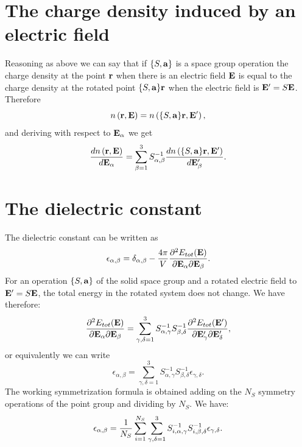 \documentclass[12pt,a4paper,twoside]{report}
\begin{document}
\section{The charge density induced by an electric field}
Reasoning as above we can say that if $\{S,{\bf a}\}$ is a space group operation the charge density
at the point ${\bf r}$ when there is an electric field ${\bf E}$ is equal to the charge density at the rotated point  $\{S,{\bf a}\}{\bf r}$ when the electric field
is ${\bf E}'=S {\bf E}$. Therefore
\begin{equation}
n\left({\bf r}, {\bf E}\right)
=n\left(\{S,{\bf a}\} {\bf r}, {\bf E}'\right), 
\end{equation}
and deriving with respect to ${\bf E}_\alpha$ we get
\begin{equation}
{d n\left({\bf r}, {\bf E}\right)
\over d {\bf E}_\alpha }=\sum_{\beta=1}^3 S^{-1}_{\alpha,\beta} {d n\left(\{S,{\bf a}\} {\bf r}, {\bf E}'\right)
\over d {\bf E}'_\beta }.
\end{equation}

\section{The dielectric constant}
The dielectric constant can be written as 
\begin{equation}
\epsilon_{\alpha,\beta}=\delta_{\alpha,\beta} -{4 \pi
\over V} {\partial^2 E_{tot} ({\bf E}) \over \partial {\bf E}_\alpha \partial {\bf E}_\beta}.
\end{equation}
For an operation $\{S,{\bf a}\}$ of the solid space group and a rotated electric field to ${\bf E}'=S{\bf E}$, the total energy in the rotated system does not change. We have therefore:
\begin{equation}
{\partial^2 E_{tot} ({\bf E}) \over \partial {\bf E}_\alpha \partial {\bf E}_\beta}=\sum_{\gamma,\delta=1}^3
S^{-1}_{\alpha,\gamma} S^{-1}_{\beta,\delta}
{\partial^2 E_{tot} ({\bf E}') \over \partial {\bf E}'_\gamma \partial {\bf E}'_\delta},
\end{equation}
or equivalently we can write
\begin{equation}
\epsilon_{\alpha,\beta}=\sum_{\gamma,\delta=1}^3
S^{-1}_{\alpha,\gamma} S^{-1}_{\beta,\delta}
\epsilon_{\gamma,\delta}.
\end{equation}
The working symmetrization formula is obtained adding on the $N_S$ symmetry operations of the point group
and dividing by $N_S$. We have:
\begin{equation}
\epsilon_{\alpha,\beta}= {1 \over N_S} \sum_{i=1}^{N_S}
\sum_{\gamma,\delta=1}^3 S^{-1}_{i,\alpha,\gamma}
S^{-1}_{i,\beta,\delta}
\epsilon_{\gamma,\delta}.
\label{symepsilon}
\end{equation}
\end{document}
